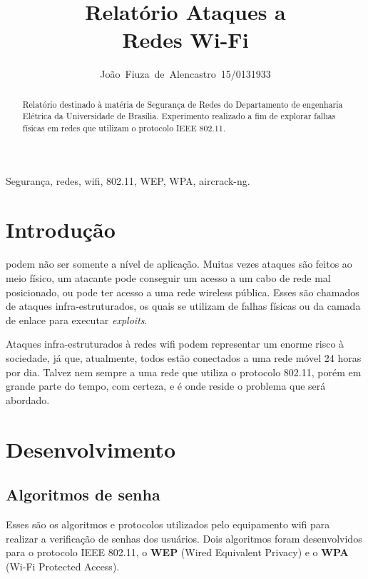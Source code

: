 \documentclass[journal]{IEEEtran}
\begin{document}
\title{Relatório Ataques a \\ Redes Wi-Fi}


\author{João~Fiuza~de~Alencastro~15/0131933}%




\maketitle


\begin{abstract}
Relatório destinado à matéria de Segurança de Redes do Departamento de engenharia Elétrica da Universidade de Brasília. Experimento realizado a fim de explorar falhas físicas em redes que utilizam o protocolo IEEE 802.11.
\end{abstract}

\begin{IEEEkeywords}
Segurança, redes, wifi, 802.11, WEP, WPA, aircrack-ng.
\end{IEEEkeywords}


\IEEEpeerreviewmaketitle



\section{Introdução}
 podem não ser somente a nível de aplicação. Muitas vezes ataques são feitos ao meio físico, um atacante pode conseguir um acesso a um cabo de rede mal posicionado, ou pode ter acesso a uma rede wireless pública. Esses são chamados de ataques infra-estruturados, os quais se utilizam de falhas físicas ou da camada de enlace para executar \textit{exploits}. \par
Ataques infra-estruturados à redes wifi podem representar um enorme risco à sociedade, já que, atualmente, todos estão conectados a uma rede móvel 24 horas por dia. Talvez nem sempre a uma rede que utiliza o protocolo 802.11, porém em grande parte do tempo, com certeza, e é onde reside o problema que será abordado.

\section{Desenvolvimento}

\subsection{Algoritmos de senha}
Esses são os algoritmos e protocolos utilizados pelo equipamento wifi para realizar a verificação de senhas dos usuários. Dois algoritmos foram desenvolvidos para o protocolo IEEE 802.11, o \textbf{WEP} (Wired Equivalent Privacy) e o \textbf{WPA} (Wi-Fi Protected Access).
\end{document}
